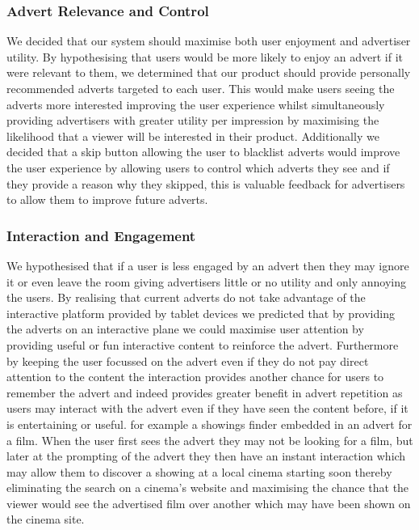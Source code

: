 \subsubsection{Advert Relevance and Control}
We decided that our system should maximise both user enjoyment and advertiser utility. By hypothesising that users would be more likely to enjoy an advert if it were relevant to them, we determined that our product should provide personally recommended adverts targeted to each user. This would make users seeing the adverts more interested improving the user experience whilst simultaneously providing advertisers with greater utility per impression by maximising the likelihood that a viewer will be interested in their product. Additionally we decided that a skip button allowing the user to blacklist adverts would improve the user experience by allowing users to control which adverts they see and if they provide a reason why they skipped, this is valuable feedback for advertisers to allow them to improve future adverts.

\subsubsection{Interaction and Engagement}
We hypothesised that if a user is less engaged by an advert then they may ignore it or even leave the room giving advertisers little or no utility and only annoying the users. By realising that current adverts do not take advantage of the interactive platform provided by tablet devices we predicted that by providing the adverts on an interactive plane we could maximise user attention by providing useful or fun interactive content to reinforce the advert. Furthermore by keeping the user focussed on the advert even if they do not pay direct attention to the content the interaction provides another chance for users to remember the advert and indeed provides greater benefit in advert repetition as users may interact with the advert even if they have seen the content before, if it is entertaining or useful. for example a showings finder embedded in an advert for a film. When the user first sees the advert they may not be looking for a film, but later at the prompting of the advert they then have an instant interaction which may allow them to discover a showing at a local cinema starting soon thereby eliminating the search on a cinema's website and maximising the chance that the viewer would see the advertised film over another which may have been shown on the cinema site.

